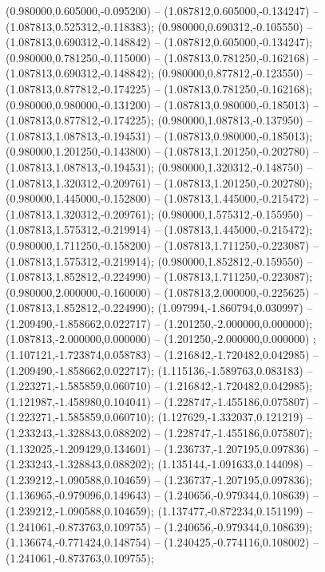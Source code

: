  (0.980000,0.605000,-0.095200) -- (1.087812,0.605000,-0.134247) -- (1.087813,0.525312,-0.118383);
 (0.980000,0.690312,-0.105550) -- (1.087813,0.690312,-0.148842) -- (1.087812,0.605000,-0.134247);
 (0.980000,0.781250,-0.115000) -- (1.087813,0.781250,-0.162168) -- (1.087813,0.690312,-0.148842);
 (0.980000,0.877812,-0.123550) -- (1.087813,0.877812,-0.174225) -- (1.087813,0.781250,-0.162168);
 (0.980000,0.980000,-0.131200) -- (1.087813,0.980000,-0.185013) -- (1.087813,0.877812,-0.174225);
 (0.980000,1.087813,-0.137950) -- (1.087813,1.087813,-0.194531) -- (1.087813,0.980000,-0.185013);
 (0.980000,1.201250,-0.143800) -- (1.087813,1.201250,-0.202780) -- (1.087813,1.087813,-0.194531);
 (0.980000,1.320312,-0.148750) -- (1.087813,1.320312,-0.209761) -- (1.087813,1.201250,-0.202780);
 (0.980000,1.445000,-0.152800) -- (1.087813,1.445000,-0.215472) -- (1.087813,1.320312,-0.209761);
 (0.980000,1.575312,-0.155950) -- (1.087813,1.575312,-0.219914) -- (1.087813,1.445000,-0.215472);
 (0.980000,1.711250,-0.158200) -- (1.087813,1.711250,-0.223087) -- (1.087813,1.575312,-0.219914);
 (0.980000,1.852812,-0.159550) -- (1.087813,1.852812,-0.224990) -- (1.087813,1.711250,-0.223087);
 (0.980000,2.000000,-0.160000) -- (1.087813,2.000000,-0.225625) -- (1.087813,1.852812,-0.224990);
 (1.097994,-1.860794,0.030997) -- (1.209490,-1.858662,0.022717) -- (1.201250,-2.000000,0.000000);
 (1.087813,-2.000000,0.000000) -- (1.201250,-2.000000,0.000000) ;
 (1.107121,-1.723874,0.058783) -- (1.216842,-1.720482,0.042985) -- (1.209490,-1.858662,0.022717);
 (1.115136,-1.589763,0.083183) -- (1.223271,-1.585859,0.060710) -- (1.216842,-1.720482,0.042985);
 (1.121987,-1.458980,0.104041) -- (1.228747,-1.455186,0.075807) -- (1.223271,-1.585859,0.060710);
 (1.127629,-1.332037,0.121219) -- (1.233243,-1.328843,0.088202) -- (1.228747,-1.455186,0.075807);
 (1.132025,-1.209429,0.134601) -- (1.236737,-1.207195,0.097836) -- (1.233243,-1.328843,0.088202);
 (1.135144,-1.091633,0.144098) -- (1.239212,-1.090588,0.104659) -- (1.236737,-1.207195,0.097836);
 (1.136965,-0.979096,0.149643) -- (1.240656,-0.979344,0.108639) -- (1.239212,-1.090588,0.104659);
 (1.137477,-0.872234,0.151199) -- (1.241061,-0.873763,0.109755) -- (1.240656,-0.979344,0.108639);
 (1.136674,-0.771424,0.148754) -- (1.240425,-0.774116,0.108002) -- (1.241061,-0.873763,0.109755);
